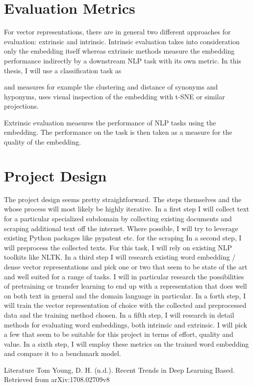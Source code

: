 \documentclass[10pt,a4paper]{article}
\begin{document}
	\section{Evaluation Metrics}
	For vector representations, there are in general two different approaches for evaluation: extrinsic and intrinsic. Intrinsic evaluation takes into consideration only the embedding itself whereas extrinsic methods measure the embedding performance indirectly by a downstream NLP task with its own metric.
	In this thesis, I will use a classification task as 
	
	and measures for example the clustering and distance of synonyms and hyponyms, uses visual inspection of the embedding with t-SNE or similar projections. 
	
	
	
	
	Extrinsic evaluation measures the performance of NLP tasks using the embedding. The performance on the task is then taken as a measure for the quality of the embedding. 
	
	\section{Project Design}
	The project design  seems pretty straightforward. The steps themselves and the whose process will most likely be highly iterative.
	In a first step I will collect text for a particular specialized subdomain by collecting existing documents and scraping additional text off the internet. Where possible, I will try to leverage existing Python packages like pypatent etc. for the scraping
	In a second step, I will preprocess the collected texts. For this task, I will rely on existing NLP toolkits like NLTK.
	In a third step I will research existing word embedding / dense vector representations and pick one or two that seem to be state of the art and well suited for a range of tasks. I will in particular research the possibilities of pretraining or transfer learning to end up with a representation that does well on both text in general and the domain language in particular. 
	In a forth step, I will train the vector representation of choice with the collected and preprocessed data and the training method chosen. 
	In a  fifth step, I will research in detail methods for evaluating word embeddings, both intrinsic and extrinsic. I will pick a few that seem to be suitable for this project in terms of effort, quality and value.
	In a sixth step, I will employ these metrics on the trained word embedding and compare it to a benchmark model. 
	
	
	Literature
	Tom Young, D. H. (n.d.). Recent Trends in Deep Learning Based. Retrieved from arXiv:1708.02709v8
	
\end{document}

